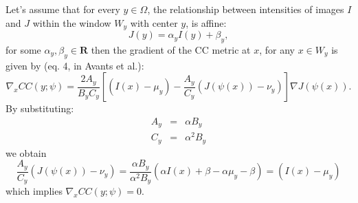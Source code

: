 Let's assume that for every $y \in \Omega$, the relationship between intensities of images $I$ and $J$ within the window $W_y$ with center $y$, is affine:
\begin{equation}
    J(y) = \alpha_{y} I(y) + \beta_{y},
\end{equation}
for some $\alpha_{y}, \beta_{y} \in \mathbf{R}$ then the gradient of the CC metric at $x$, for any $x\in W_{y}$ is given by (eq. 4, in Avants et al.\cite{Avants2008}):
\begin{equation}
    \nabla_{x} CC(y; \psi) = \frac{2A_{y}}{B_{y}C_{y}}\left[ (I(x) - \mu_{y}) - \frac{A_{y}}{C_{y}}\left(J(\psi(x)) - \nu_{y}\right)\right]\nabla J(\psi(x)).
\end{equation}
By substituting:
\begin{equation}
    \begin{array}{lll}
        A_{y} &=& \alpha B_{y}\\
        C_{y} &=& \alpha^{2}B_{y}
    \end{array}
\end{equation}
we obtain
\begin{equation}
    \frac{A_{y}}{C_{y}}\left(J(\psi(x)) - \nu_{y}\right) =
    \frac{\alpha B_{y}}{\alpha^{2}B_{y}}\left(\alpha I(x) + \beta - \alpha \mu_{y} - \beta \right) = (I(x) - \mu_{y})
\end{equation}
which implies $\nabla_{x} CC(y; \psi) = 0$.
